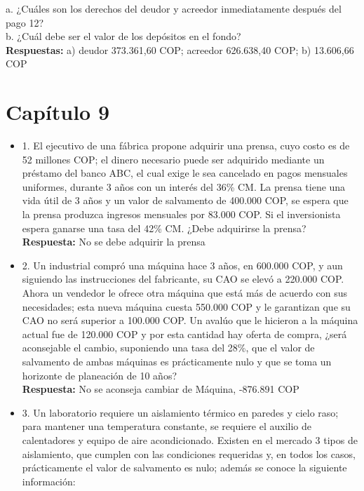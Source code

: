 \begin{itemize}
       a.	¿Cuáles son los derechos del deudor y acreedor inmediatamente después del pago 12? \\
       b.	¿Cuál debe ser el valor de los depósitos en el fondo?\\
       \textbf{Respuestas:} a) deudor 373.361,60 COP; acreedor 626.638,40 COP; b) 13.606,66 COP

\end{itemize}


\chapter*{Capítulo 9}


\begin{itemize}
 \item 1. El ejecutivo de una fábrica propone adquirir una prensa, cuyo costo es de 52 millones COP; el dinero necesario puede ser adquirido mediante un préstamo del banco ABC, el cual exige le sea cancelado en pagos mensuales uniformes, durante 3 años con un interés del 36\% CM. La prensa tiene una vida útil de 3 años y un valor de salvamento de 400.000 COP, se espera que la prensa produzca ingresos mensuales por 83.000 COP. Si el inversionista espera ganarse una tasa del 42\% CM. ¿Debe adquirirse la prensa? \\

       \textbf{Respuesta:} No se debe adquirir la prensa
       \medskip

 \item 2. Un industrial compró una máquina hace 3 años, en 600.000 COP, y aun siguiendo las instrucciones del fabricante, su CAO se elevó a 220.000 COP. Ahora un vendedor le ofrece otra máquina que está más de acuerdo con sus necesidades; esta nueva máquina cuesta 550.000 COP y le garantizan que su CAO no será superior a 100.000 COP. Un avalúo que le hicieron a la máquina actual fue de 120.000 COP y por esta cantidad  hay oferta de compra, ¿será aconsejable el cambio, suponiendo una tasa del 28\%, que el valor de salvamento de ambas máquinas es prácticamente nulo y que se toma un horizonte de planeación de 10 años? \\

       \textbf{Respuesta:} No se aconseja cambiar de Máquina, -876.891 COP
       \medskip

 \item 3. Un laboratorio requiere un aislamiento térmico en paredes y cielo raso; para mantener una temperatura constante, se requiere el auxilio de calentadores y equipo de aire acondicionado. Existen en el mercado 3 tipos de aislamiento, que cumplen con las condiciones requeridas y, en todos los casos, prácticamente el valor de salvamento es nulo; además se conoce la siguiente información: \\


\end{itemize}
